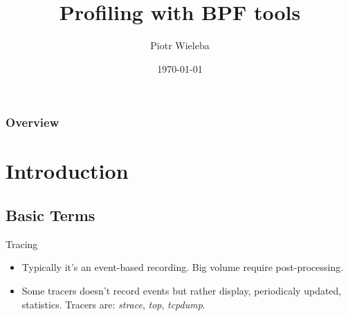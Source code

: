 \documentclass{beamer}
\title[BFP Tools]{Profiling with BPF tools} %
\author{Piotr Wieleba} %
\institute[DataArt] %
{
DataArt\\ %
\medskip
\textit{piotr.wieleba@dataart.com} %
}
\date{\today} %
\begin{document}
\begin{frame}
\titlepage %
\end{frame}


\begin{frame}
\frametitle{Overview} %
\tableofcontents %
\end{frame}


\section{Introduction} %
\subsection{Basic Terms}

\begin{frame}
  \begin{block}{Tracing}
    \begin{itemize}
      \item<+-> Typically it's an event-based recording.  Big volume require post-processing.
      \item<+-> Some tracers doesn't record events but rather display, periodicaly updated, statistics. Tracers are: \emph{strace}, \emph{top}, \emph{tcpdump}. 
    \end{itemize}
  \end{block}
\end{frame}
\end{document}
